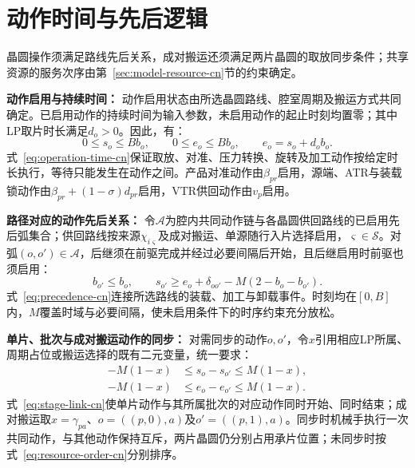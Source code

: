 \section{动作时间与先后逻辑}
\label{sec:model-time-cn}

晶圆操作须满足路线先后关系，成对搬运还须满足两片晶圆的取放同步条件；共享资源的服务次序由第~\ref{sec:model-resource-cn}节的约束确定。

\noindent\textbf{动作启用与持续时间：}
动作启用状态由所选晶圆路线、腔室周期及搬运方式共同确定。已启用动作的持续时间为输入参数，未启用动作的起止时刻均置零；其中LP取片时长满足$d_o>0$。因此，有：
\begin{equation}
0\le s_o\le B b_o,\qquad
0\le e_o\le B b_o,\qquad
e_o=s_o+d_ob_o.
\label{eq:operation-time-cn}
\end{equation}
式~\eqref{eq:operation-time-cn}保证取放、对准、压力转换、旋转及加工动作按给定时长执行，等待只能发生在动作之间。产品对准动作由$\beta_{pr}$启用，源端、ATR与装载锁动作由$\beta_{pr}+(1-\sigma)d_{pr}$启用，VTR供回动作由$v_p$启用。

\noindent\textbf{路径对应的动作先后关系：}
令$\mathcal A$为腔内共同动作链与各晶圆供回路线的已启用先后弧集合；供回路线按来源$\chi_{i\varsigma}$及成对搬运、单源随行入片选择启用，$\varsigma\in\mathcal S$。对弧$(o,o')\in\mathcal A$，后继须在前驱完成并经过必要间隔后开始，且后继启用时前驱也须启用：
\begin{equation}
b_{o'}\le b_o,\qquad
s_{o'}\ge e_o+\delta_{oo'}-M(2-b_o-b_{o'}).
\label{eq:precedence-cn}
\end{equation}
式~\eqref{eq:precedence-cn}连接所选路线的装载、加工与卸载事件。时刻均在$[0,B]$内，$M$覆盖时域与必要间隔，使未启用条件下的时序约束充分放松。

\noindent\textbf{单片、批次与成对搬运动作的同步：}
对需同步的动作$o,o'$，令$x$引用相应LP所属、周期占位或搬运选择的既有二元变量，统一要求：
\begin{equation}
\begin{aligned}
-M(1-x)&\le s_o-s_{o'}\le M(1-x),\\
-M(1-x)&\le e_o-e_{o'}\le M(1-x).
\end{aligned}
\label{eq:stage-link-cn}
\end{equation}
式~\eqref{eq:stage-link-cn}使单片动作与其所属批次的对应动作同时开始、同时结束；成对搬运取$x=\gamma_{pa}$、$o=((p,0),a)$及$o'=((p,1),a)$。同步时机械手执行一次共同动作，与其他动作保持互斥，两片晶圆仍分别占用承片位置；未同步时按式~\eqref{eq:resource-order-cn}分别排序。

